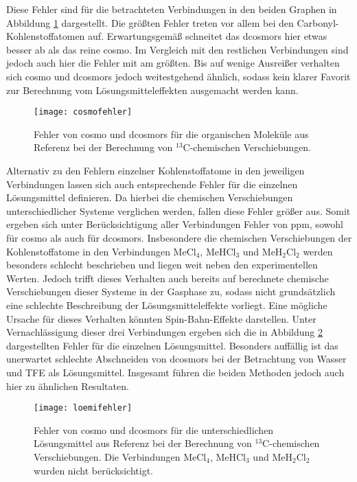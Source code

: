     Diese Fehler sind für die betrachteten Verbindungen in den beiden Graphen in Abbildung \ref{abb:cosmofehler} dargestellt. Die größten Fehler treten vor allem bei den Carbonyl-Kohlenstoffatomen auf. Erwartungsgemäß schneitet das \ac{dcosmors} hier etwas besser ab als das reine \ac{cosmo}. Im Vergleich mit den restlichen Verbindungen sind jedoch auch hier die Fehler mit am größten. Bis auf wenige Ausreißer verhalten sich \ac{cosmo} und \ac{dcosmors} jedoch weitestgehend ähnlich, sodass kein klarer Favorit zur Berechnung vom Lösungsmitteleffekten ausgemacht werden kann.
   	\begin{figure}[ht!]
	\centering
	\texttt{[image: cosmofehler]}
	\captionsetup{figurewithin = chapter}
	\captionsetup{font=small, labelfont=bf}\caption[{Fehler von \ac{cosmo} und \ac{dcosmors} für $^{13}$C-chemische Verschiebungen}]{Fehler von \ac{cosmo} und \ac{dcosmors} für die organischen Moleküle aus Referenz \cite{fulmer2010nmr} bei der Berechnung von $^{13}$C-chemischen Verschiebungen.}
	\label{abb:cosmofehler}
	\end{figure} 
\vfill
\FloatBarrier
\newpage
	Alternativ zu den Fehlern einzelner Kohlenstoffatome in den jeweiligen Verbindungen lassen sich auch entsprechende Fehler für die einzelnen Lösungsmittel definieren. Da hierbei die chemischen Verschiebungen unterschiedlicher Systeme verglichen werden, fallen diese Fehler größer aus. Somit ergeben sich unter Berücksichtigung aller Verbindungen Fehler von \unit[10--11]{ppm}, sowohl für \ac{cosmo} als auch für \ac{dcosmors}. Insbesondere die chemischen Verschiebungen der Kohlenstoffatome in den Verbindungen MeCl$_4$, MeHCl$_3$ und MeH$_2$Cl$_2$ werden besonders schlecht beschrieben und liegen weit neben den experimentellen Werten. Jedoch trifft dieses Verhalten auch bereits auf berechnete chemische Verschiebungen dieser Systeme in der Gasphase zu, sodass nicht grundsätzlich eine schlechte Beschreibung der Lösungsmitteleffekte vorliegt. Eine mögliche Ursache für dieses Verhalten könnten Spin-Bahn-Effekte darstellen.\supercite{yannickpers} Unter Vernachlässigung dieser drei Verbindungen ergeben sich die in Abbildung \ref{abb:loemifehler} dargestellten Fehler für die einzelnen Lösungsmittel. Besonders auffällig ist das unerwartet schlechte Abschneiden von \ac{dcosmors} bei der Betrachtung von Wasser und TFE als Lösungsmittel. Insgesamt führen die beiden Methoden jedoch auch hier zu ähnlichen Resultaten.
   	\begin{figure}[ht!]
	\centering
	\texttt{[image: loemifehler]}
	\captionsetup{figurewithin = chapter}
	\captionsetup{font=small, labelfont=bf}\caption[{Fehler von \ac{cosmo} und \ac{dcosmors} für unterschiedliche Lösungsmittel}]{Fehler von \ac{cosmo} und \ac{dcosmors} für die unterschiedlichen Lösungsmittel aus Referenz \cite{fulmer2010nmr} bei der Berechnung von $^{13}$C-chemischen Verschiebungen. Die Verbindungen MeCl$_4$, MeHCl$_3$ und MeH$_2$Cl$_2$ wurden nicht berücksichtigt.}
	\label{abb:loemifehler}
	\end{figure}    	
\vfil
\newpage
	
